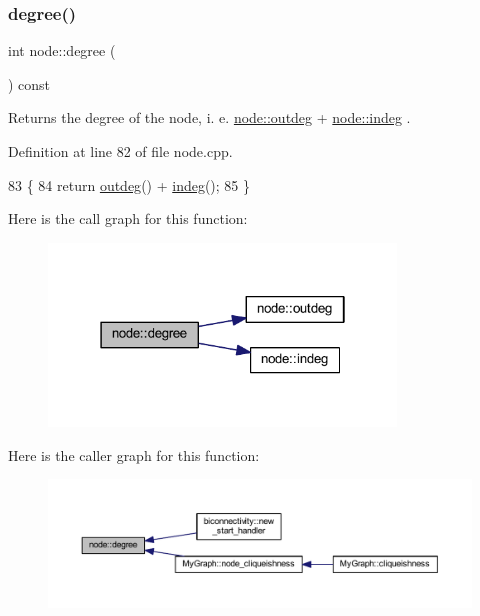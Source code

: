 \subsubsection{\texorpdfstring{degree()}{degree()}}
{\footnotesize\ttfamily int node\+::degree (\begin{DoxyParamCaption}{ }\end{DoxyParamCaption}) const}

Returns the degree of the node, i. e. \mbox{\hyperlink{classnode_a32adc45c4132e2642ccd2233d79ffe67}{node\+::outdeg}} + \mbox{\hyperlink{classnode_a749bfd1316584b96f8c9b0e44ad512f0}{node\+::indeg}} . 

Definition at line 82 of file node.\+cpp.


\begin{DoxyCode}
83 \{
84     \textcolor{keywordflow}{return} \mbox{\hyperlink{classnode_a32adc45c4132e2642ccd2233d79ffe67}{outdeg}}() + \mbox{\hyperlink{classnode_a749bfd1316584b96f8c9b0e44ad512f0}{indeg}}();
85 \}
\end{DoxyCode}
Here is the call graph for this function\+:\nopagebreak
\begin{figure}[H]
\begin{center}
\leavevmode
\includegraphics[width=262pt]{classnode_a1e5e94e426da180a069cf307616e38e3_cgraph}
\end{center}
\end{figure}
Here is the caller graph for this function\+:\nopagebreak
\begin{figure}[H]
\begin{center}
\leavevmode
\includegraphics[width=350pt]{classnode_a1e5e94e426da180a069cf307616e38e3_icgraph}
\end{center}
\end{figure}
\mbox{\label{classnode_aba6b3a48e7b951f08ebbbf3275f0ce9a}} 
